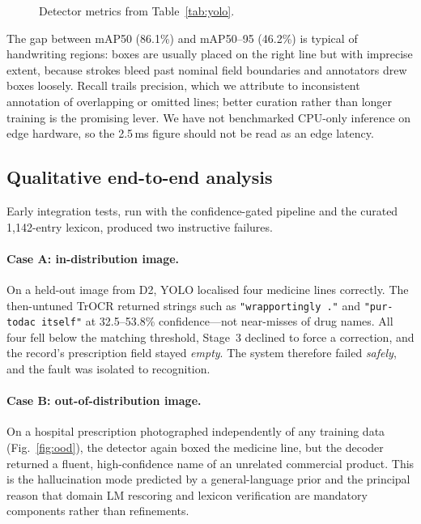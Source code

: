 \documentclass[journal]{IEEEtran}
\begin{document}
\begin{figure}[t]
\centering
\resizebox{0.85\columnwidth}{!}{}
\caption{Detector metrics from Table~\ref{tab:yolo}.}
\label{fig:yolores}
\end{figure}

The gap between mAP50 (86.1\%) and mAP50--95 (46.2\%) is typical of handwriting regions: boxes are usually placed on the right line but with imprecise extent, because strokes bleed past nominal field boundaries and annotators drew boxes loosely. Recall trails precision, which we attribute to inconsistent annotation of overlapping or omitted lines; better curation rather than longer training is the promising lever. We have not benchmarked CPU-only inference on edge hardware, so the 2.5\,ms figure should not be read as an edge latency.

\subsection{Qualitative end-to-end analysis}
Early integration tests, run with the confidence-gated pipeline and the curated 1{,}142-entry lexicon, produced two instructive failures.

\paragraph{Case A: in-distribution image.} On a held-out image from D2, YOLO localised four medicine lines correctly. The then-untuned TrOCR returned strings such as \texttt{"wrapportingly ."} and \texttt{"pur-todac itself"} at 32.5--53.8\% confidence---not near-misses of drug names. All four fell below the matching threshold, Stage~3 declined to force a correction, and the record's prescription field stayed \emph{empty}. The system therefore failed \emph{safely}, and the fault was isolated to recognition.

\paragraph{Case B: out-of-distribution image.} On a hospital prescription photographed independently of any training data (Fig.~\ref{fig:ood}), the detector again boxed the medicine line, but the decoder returned a fluent, high-confidence name of an unrelated commercial product. This is the hallucination mode predicted by a general-language prior and the principal reason that domain LM rescoring and lexicon verification are mandatory components rather than refinements.
\end{document}
